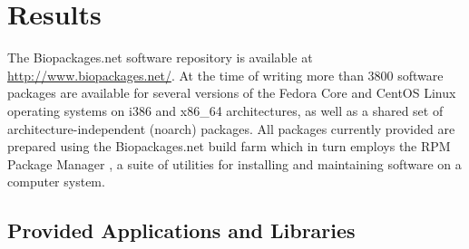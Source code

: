 
\section{Results}

The Biopackages.net software repository is available at
\url{http://www.biopackages.net/}.  At the time of writing more than 3800 software packages %
are available for several versions of the Fedora Core and CentOS Linux operating systems on
i386 and x86\_64 architectures, as well as a shared set of
architecture-independent (noarch) packages.  All packages currently provided
are prepared using the Biopackages.net build farm which in turn employs the RPM
Package Manager \cite{herrold}, a suite of utilities for installing and
maintaining software on a computer system.

\subsection{Provided Applications and Libraries}

